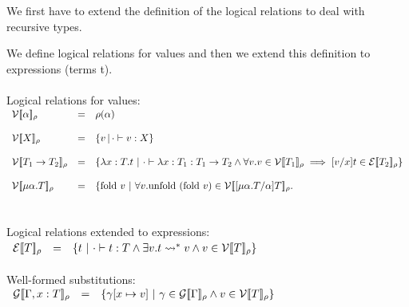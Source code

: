 We first have to extend the definition of the logical relations to deal with recursive types.  
\begin{definition}
  \label{def:logical_relations}
  We define logical relations for values and then we extend this definition to
  expressions (terms t).\\
  \ \\
  Logical relations for values: \\
  \begin{math}
    \begin{array}{lllll}
      \mathcal{V}\interp{\alpha}_\rho & = & \rho(\alpha) \\
      & \\
      \mathcal{V}\interp{X}_\rho & = &  \{ v\,|\,\cdot \vdash v : X \} \\
      & \\
      \mathcal{V}\interp{T_1 \to T_2}_\rho & = & \{ \lambda x:T.t\ |\ 
      \cdot \vdash \lambda x:T_1 : T_1 \to T_2 \land
      \forall v.v \in \mathcal{V} \interp{T_1}_\rho \implies 
              [v/x]t \in \mathcal{E}\interp{T_2}_\rho \}\\
      & \\
      \mathcal{V}\interp{\mu \alpha.T}_\rho & = & 
      \{ \text{fold}\ v\ |\ \forall v.
        \text{unfold}\ (\text{fold}\ v) \in \mathcal{V}\interp{[\mu \alpha.T/\alpha]T}_\rho.\\
    \end{array}
  \end{math}
  \ \\
  \ \\
  Logical relations extended to expressions:\\
  \begin{math}
    \begin{array}{lll}
      \mathcal{E}[\negthinspace[T]\negthinspace]_\rho & = & \{ t\ |\ \cdot \vdash t:T \land 
      \exists v.t \rightsquigarrow^* v \land v \in \mathcal{V}[\negthinspace[T]\negthinspace]_\rho \}
    \end{array}
  \end{math}
  \ \\
  \ \\
  Well-formed substitutions:\\
  \begin{math}
    \begin{array}{lllll}
        \mathcal{G}[\negthinspace[\Gamma,x:T]\negthinspace]_\rho & = & 
        \{ \gamma[x \mapsto v]\ |\ \gamma \in \mathcal{G}[\negthinspace[\Gamma]\negthinspace]_\rho \land 
        v \in \mathcal{V}[\negthinspace[T]\negthinspace]_\rho \}
    \end{array}
  \end{math}
\end{definition}

